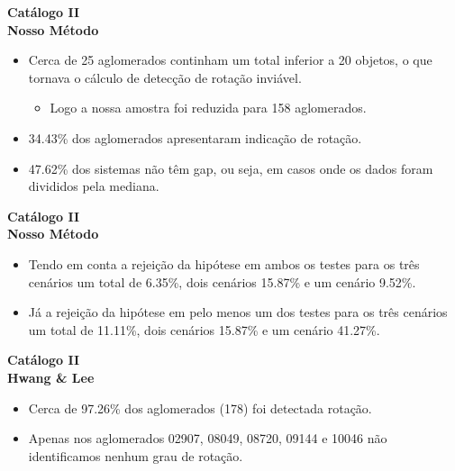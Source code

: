 \documentclass[xcolor=dvipsnames,10pt]{beamer}
\begin{document}
\begin{frame}{\textbf{Catálogo II}}
  \\
  {\textbf{Nosso Método}}
  \begin{itemize}
    \item Cerca de 25 aglomerados continham um total inferior a 20 objetos, o que tornava o cálculo de detecção de rotação inviável.
    \begin{itemize}
      \item Logo a nossa amostra foi reduzida para 158 aglomerados.
    \end{itemize}
    \item 34.43\% dos aglomerados apresentaram indicação de rotação.
    \item 47.62\% dos sistemas não têm gap, ou seja, em casos onde os dados foram divididos pela mediana.
  \end{itemize}
\end{frame}

\begin{frame}{\textbf{Catálogo II}}
  \\
  {\textbf{Nosso Método}}
  \begin{itemize}
    \item Tendo em conta a rejeição da hipótese em ambos os testes para os três cenários um total de 6.35\%, dois cenários 15.87\% e um cenário 9.52\%.
    \item Já a rejeição da hipótese em pelo menos um dos testes para os três cenários um total de 11.11\%, dois cenários 15.87\% e um cenário 41.27\%.
  \end{itemize}
\end{frame}

\begin{frame}{\textbf{Catálogo II}}
  \\
  {\textbf{Hwang \& Lee}}
  \begin{itemize}
    \item Cerca de 97.26\% dos aglomerados (178) foi detectada rotação. 
    \item Apenas nos aglomerados 02907, 08049, 08720, 09144 e 10046 não identificamos nenhum grau de rotação.
  \end{itemize}
\end{frame}
\end{document}
